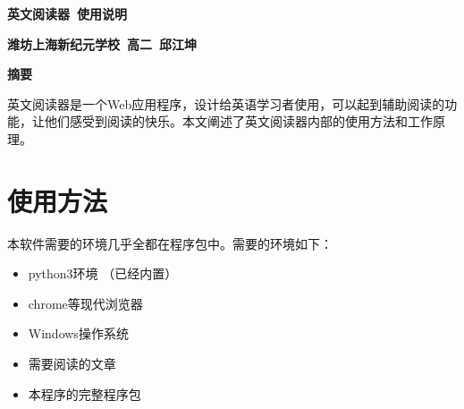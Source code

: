 \documentclass[a4paper, 11pt， oneside]{article}
\author{邱江坤}
\begin{document}


\begin{titlepage}
\begin{center}\textbf{英文阅读器\ 使用说明}\end{center}
\begin{center}\textbf{潍坊上海新纪元学校\ 高二\ 邱江坤}\end{center}

\end{titlepage}

\noindent{}\begin{center}\textbf{摘要}\quad{}\end{center}
    英文阅读器是一个Web应用程序，设计给英语学习者使用，可以起到辅助阅读的功能，让他们感受到阅读的快乐。本文阐述了英文阅读器内部的使用方法和工作原理。
\newpage
\tableofcontents
\newpage
\section{使用方法}
    本软件需要的环境几乎全都在程序包中。需要的环境如下：

    \begin{itemize}
        \item  python3环境 （已经内置）
        \item  chrome等现代浏览器
        \item  Windows操作系统
        \item  需要阅读的文章
        \item  本程序的完整程序包
    \end{itemize}
\end{document}
